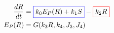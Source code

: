 \documentclass[preview]{standalone}
\begin{document}
\pagestyle{empty}
\begin{equation*}
\begin{aligned}
	\frac{dR}{dt} & = {\color{blue}\boxed{\color{black} k_0 E_P(R) + k_1 S }} - \color{red}{\boxed{\color{black} k_2 R}} \\ 
	E_P(R) & = G(k_3 R, k_4, J_3, J_4)
\end{aligned}
\end{equation*}
\vfill
\end{document}
